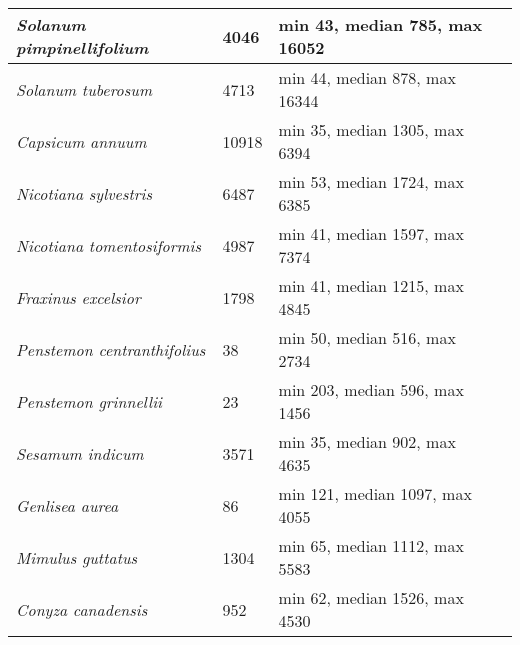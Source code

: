 {\begin{longtable}{| L{4cm} | L{2cm}  | L{5cm} | L{4cm} |}
\textit{Solanum pimpinellifolium} & 4046 & min 43, median 785, max 16052 & \\ \hline
\textit{Solanum tuberosum} & 4713 & min 44, median 878, max 16344 & \\ \hline
\textit{Capsicum annuum} & 10918 & min 35, median 1305, max 6394 & \\ \hline
\textit{Nicotiana sylvestris} & 6487 & min 53, median 1724, max 6385 & \\ \hline
\textit{Nicotiana tomentosiformis} & 4987 & min 41, median 1597, max 7374 & \\ \hline
\textit{Fraxinus excelsior} & 1798 & min 41, median 1215, max 4845 & \\ \hline
\textit{Penstemon centranthifolius} & 38 & min 50, median 516, max 2734 & \\ \hline
\textit{Penstemon grinnellii} & 23 & min 203, median 596, max 1456 & \\ \hline
\textit{Sesamum indicum} & 3571 & min 35, median 902, max 4635 & \\ \hline
\textit{Genlisea aurea} & 86 & min 121, median 1097, max 4055 & \\ \hline
\textit{Mimulus guttatus} & 1304 & min 65, median 1112, max 5583 & \\ \hline
\textit{Conyza canadensis} & 952 & min 62, median 1526, max 4530 & \\ \hline



\end{longtable}}
\clearpage